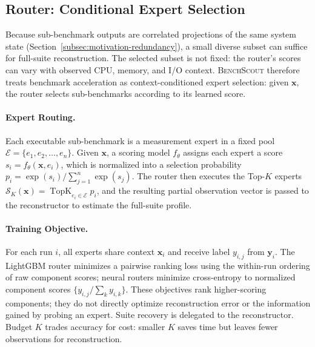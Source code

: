 \documentclass[sigconf, review, anonymous, balance=false]{acmart}
\newcommand{\ourmethod}{\textsc{BenchScout}\xspace}
\begin{document}
\subsection{Router: Conditional Expert Selection}
\label{subsec:router}

Because sub-benchmark outputs are correlated projections of the same system state (Section~\ref{subsec:motivation-redundancy}), a small diverse subset can suffice for full-suite reconstruction.
The selected subset is not fixed: the router's scores can vary with observed CPU, memory, and I/O context.
\ourmethod therefore treats benchmark acceleration as context-conditioned expert selection: given \(\mathbf{x}\), the router selects sub-benchmarks according to its learned score.

\paragraph{Expert Routing.}
Each executable sub-benchmark is a measurement expert in a fixed pool $\mathcal{E}=\{e_1,e_2,\ldots,e_n\}$.
Given \(\mathbf{x}\), a scoring model \(f_\theta\) assigns each expert a score \(s_i=f_\theta(\mathbf{x},e_i)\), which is normalized into a selection probability \(p_i=\exp(s_i)/\sum_{j=1}^{n}\exp(s_j)\).
The router then executes the Top-\(K\) experts \(\mathcal{S}_K(\mathbf{x})=\operatorname{TopK}_{e_i\in\mathcal{E}} p_i\), and the resulting partial observation vector is passed to the reconstructor to estimate the full-suite profile.

\paragraph{Training Objective.}
For each run $i$, all experts share context $\mathbf{x}_i$ and receive label $y_{i,j}$ from $\mathbf{y}_i$.
The LightGBM router minimizes a pairwise ranking loss using the within-run ordering of raw component scores; neural routers minimize cross-entropy to normalized component scores $\{y_{i,j}/\sum_k y_{i,k}\}$.
These objectives rank higher-scoring components; they do not directly optimize reconstruction error or the information gained by probing an expert.
Suite recovery is delegated to the reconstructor.
Budget $K$ trades accuracy for cost: smaller $K$ saves time but leaves fewer observations for reconstruction.
\end{document}
